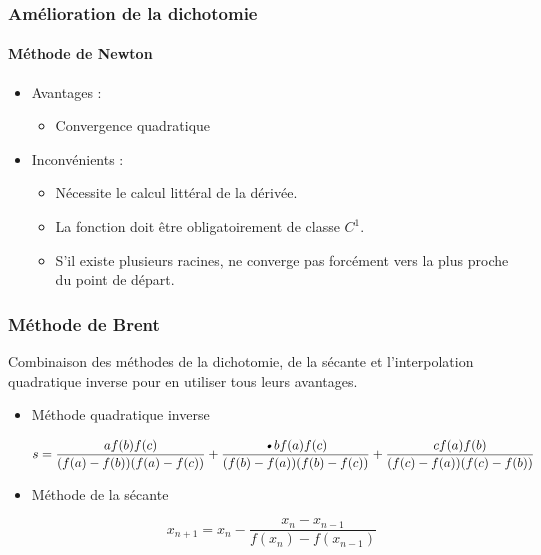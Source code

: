 \documentclass[french]{beamer}
\begin{document}

\begin{frame}
\frametitle{Amélioration de la dichotomie}
\framesubtitle{Méthode de Newton}

   \begin{itemize}
      \item Avantages :
         \begin{itemize}
            \item Convergence quadratique
         \end{itemize}
      \item Inconvénients :
      \begin{itemize}
         \item Nécessite le calcul littéral de la dérivée.
         \item La fonction doit être obligatoirement de classe $C^1$.
         \item S'il existe plusieurs racines, ne converge pas forcément vers la plus proche du point de départ.
      \end{itemize}
   \end{itemize}
\end{frame}


\begin{frame}
\frametitle{Méthode de Brent}

Combinaison des méthodes de la dichotomie, de la sécante et l'interpolation quadratique inverse pour en utiliser tous leurs avantages.

   \begin{itemize}
      \item Méthode quadratique inverse

      \begin{equation}
         s = \frac{af(b)f(c)}{(f(a)-f(b))(f(a)-f(c))} 
  + \frac{\textsl{•}bf(a)f(c)}{(f(b)-f(a))(f(b)-f(c))}
  + \frac{cf(a)f(b)}{(f(c)-f(a))(f(c)-f(b))}
     \end{equation}

     \item Méthode de la sécante

     \begin{equation}
        x_{n+1} = x_n - \frac{x_n - x_{n-1}}{f(x_n) - f(x_{n-1})}
     \end{equation}

   \end{itemize}
\end{frame}
\end{document}
